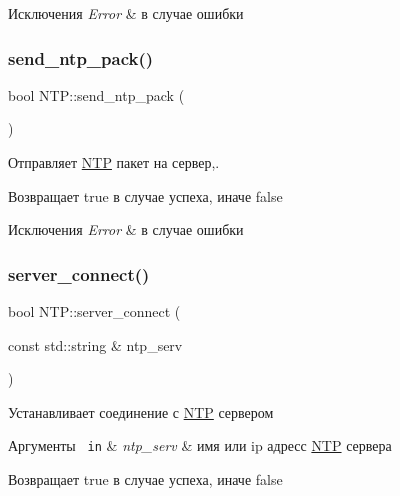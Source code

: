 \begin{DoxyExceptions}{Исключения}
{\em Error} & в случае ошибки \\
\hline
\end{DoxyExceptions}
\mbox{\label{classNTP_ab1a3d3f9d0edce03daadfe77a82a52e1}} 
\subsubsection{\texorpdfstring{send\_ntp\_pack()}{send\_ntp\_pack()}}
{\footnotesize\ttfamily bool N\+T\+P\+::send\+\_\+ntp\+\_\+pack (\begin{DoxyParamCaption}{ }\end{DoxyParamCaption})\hspace{0.3cm}{\ttfamily [private]}}



Отправляет \mbox{\hyperlink{classNTP}{N\+TP}} пакет на сервер,. 

\begin{DoxyReturn}{Возвращает}
true в случае успеха, иначе false 
\end{DoxyReturn}

\begin{DoxyExceptions}{Исключения}
{\em Error} & в случае ошибки \\
\hline
\end{DoxyExceptions}
\mbox{\label{classNTP_af39e8a73dc451c84f20451df932abf82}} 
\subsubsection{\texorpdfstring{server\_connect()}{server\_connect()}}
{\footnotesize\ttfamily bool N\+T\+P\+::server\+\_\+connect (\begin{DoxyParamCaption}\item[{const std\+::string \&}]{ntp\+\_\+serv }\end{DoxyParamCaption})\hspace{0.3cm}{\ttfamily [private]}}



Устанавливает соединение с \mbox{\hyperlink{classNTP}{N\+TP}} сервером 


\begin{DoxyParams}[1]{Аргументы}
\mbox{\texttt{ in}}  & {\em ntp\+\_\+serv} & имя или ip адресс \mbox{\hyperlink{classNTP}{N\+TP}} сервера \\
\hline
\end{DoxyParams}
\begin{DoxyReturn}{Возвращает}
true в случае успеха, иначе false 
\end{DoxyReturn}
\mbox{\label{classNTP_a5ac9726537b663175fe6487716efc4c7}} 
